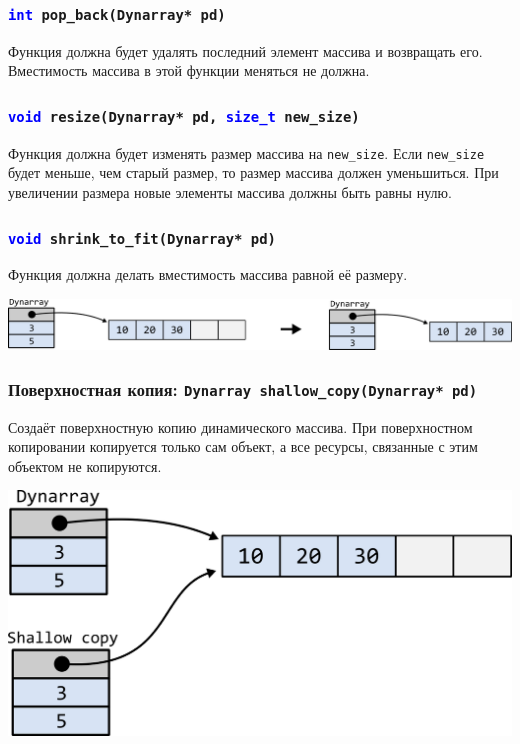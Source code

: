 \documentclass{article}
\begin{document}
\subsubsection{\texttt{\textcolor{blue}{int} pop\_back(Dynarray* pd)}}
Функция должна будет удалять последний элемент массива и возвращать его. Вместимость массива в этой функции меняться не должна.


\subsubsection{\texttt{\textcolor{blue}{void} resize(Dynarray* pd, \textcolor{blue}{size\_t} new\_size)}}
Функция должна будет изменять размер массива на \texttt{new\_size}. Если \texttt{new\_size} будет меньше, чем старый размер, то размер массива должен уменьшиться. При увеличении размера новые элементы массива должны быть равны нулю.


\subsubsection{\texttt{\textcolor{blue}{void} shrink\_to\_fit(Dynarray* pd)}}
Функция должна делать вместимость массива равной её размеру.\\
\begin{center}
\includegraphics[scale=1]{../images/dynarray_shrink_to_fit.png}
\end{center}

\subsubsection{Поверхностная копия: \texttt{Dynarray shallow\_copy(Dynarray* pd)}}
Создаёт поверхностную копию динамического массива. При поверхностном копировании копируется только сам объект, а все ресурсы, связанные с этим объектом не копируются.
\begin{center}
\includegraphics[scale=0.8]{../images/dynarray_shallow.png}
\end{center}
\end{document}

